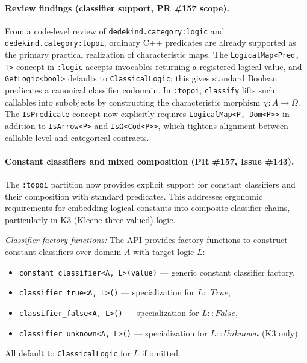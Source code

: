 \documentclass[11pt, a4paper]{report}
\begin{document}
\paragraph{Review findings (classifier support, PR \#157 scope).}
From a code-level review of \texttt{dedekind.category:logic} and \texttt{dedekind.category:topoi}, ordinary C++ predicates are already supported as the primary practical realization of characteristic maps.
The \texttt{LogicalMap<Pred, T>} concept in \texttt{:logic} accepts invocables returning a registered logical value, and \texttt{GetLogic<bool>} defaults to \texttt{ClassicalLogic}; this gives standard Boolean predicates a canonical classifier codomain.
In \texttt{:topoi}, \texttt{classify} lifts such callables into subobjects by constructing the characteristic morphism $\chi : A \to \Omega$.
The \texttt{IsPredicate} concept now explicitly requires \texttt{LogicalMap<P, Dom<P>>} in addition to \texttt{IsArrow<P>} and \texttt{IsΩ<Cod<P>>}, which tightens alignment between callable-level and categorical contracts.

\paragraph{Constant classifiers and mixed composition (PR \#157, Issue \#143).}
The \texttt{:topoi} partition now provides explicit support for constant classifiers and their composition with standard predicates.
This addresses ergonomic requirements for embedding logical constants into composite classifier chains, particularly in K3 (Kleene three-valued) logic.

\textit{Classifier factory functions:} The API provides factory functions to construct constant classifiers over domain $A$ with target logic $L$:
\begin{itemize}
  \item \texttt{constant\_classifier<A, L>(value)} — generic constant classifier factory,
  \item \texttt{classifier\_true<A, L>()} — specialization for $L::True$,
  \item \texttt{classifier\_false<A, L>()} — specialization for $L::False$,
  \item \texttt{classifier\_unknown<A, L>()} — specialization for $L::Unknown$ (K3 only).
\end{itemize}
All default to \texttt{ClassicalLogic} for $L$ if omitted.
\end{document}
